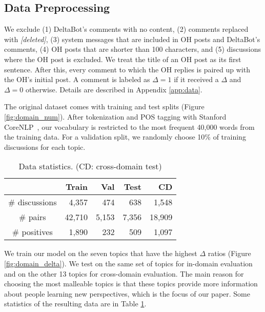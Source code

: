 \documentclass[11pt,a4paper]{article}
\begin{document}
\subsection{Data Preprocessing}

We exclude (1) DeltaBot's comments with no content, (2) comments replaced with \emph{[deleted]}, (3) system messages that are included in OH posts and DeltaBot's comments, (4) OH posts that are shorter than 100 characters, and (5) discussions where the OH post is excluded. We treat the title of an OH post as its first sentence. After this, every comment to which the OH replies is paired up with the OH's initial post. A comment is labeled as $\Delta = 1$ if it received a $\Delta$ and $\Delta = 0$ otherwise. Details are described in Appendix \ref{app:data}.

The original dataset comes with training and test splits (Figure \ref{fig:domain_num}). After tokenization and POS tagging with Stanford CoreNLP~\cite{manning2014stanford}, our vocabulary is restricted to the most frequent 40,000 words from the training data. For a validation split, we randomly choose 10\% of training discussions for each topic.   

\begin{table}[t]
	\centering
    \begin{tabularx}{\linewidth}{crrrr} \toprule
     & Train & Val & Test & CD\\ \midrule
    \# discussions & 4,357 & 474 & 638 & 1,548 \\
    \# pairs & 42,710 & 5,153 & 7,356 & 18,909 \\
    \# positives & 1,890 & 232 & 509 & 1,097 \\
    \bottomrule\end{tabularx}
    \caption{Data statistics. (CD: cross-domain test)\label{tab:data_statistics}}
\end{table}


We train our model on the seven topics that have the highest $\Delta$ ratios (Figure \ref{fig:domain_delta}). We test on the same set of topics for in-domain evaluation and on the other 13 topics for cross-domain evaluation. The main reason for choosing the most malleable topics is that these topics provide more information about people learning new perspectives, which is the focus of our paper. Some statistics of the resulting data are in Table \ref{tab:data_statistics}.
\end{document}

